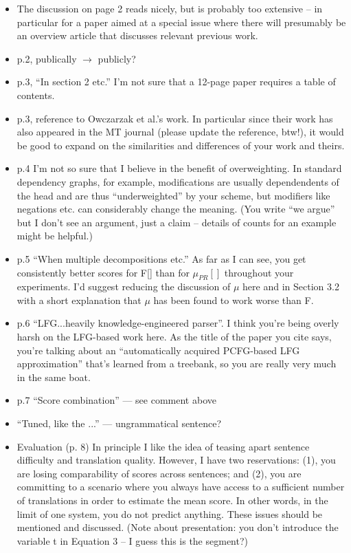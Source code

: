 \documentclass[letterpaper,12pt]{article}
\begin{document}
\begin{itemize}
\item The discussion on page 2 reads nicely, but is probably too
  extensive -- in particular for a paper aimed at a special issue
  where there will presumably be an overview article that discusses
  relevant previous work.

\item  p.2, publically $\to$ publicly?

\item  p.3, ``In section 2 etc.'' I'm not sure that a 12-page paper
  requires a table of contents.

\item  p.3, reference to Owczarzak et al.'s work. In particular since
  their work has also appeared in the MT journal (please update the
  reference, btw!), it would be good to expand on the similarities and
  differences of your work and theirs.

\item p.4 I'm not so sure that I believe in the benefit of overweighting.
  In standard dependency graphs, for example, modifications are
  usually dependendents of the head and are thus ``underweighted'' by
  your scheme, but modifiers like negations etc. can considerably
  change the meaning.  (You write ``we argue'' but I don't see an
  argument, just a claim -- details of counts for an example might be
  helpful.)

\item p.5 ``When multiple decompositions etc.'' As far as I can see, you
  get consistently better scores for F[] than for $\mu_{PR}[]$
  throughout your experiments.  I'd suggest reducing the discussion of
  $\mu$ here and in Section 3.2 with a short explanation that $\mu$
  has been found to work worse than F.

\item  p.6 ``LFG...heavily knowledge-engineered parser''. I think you're
  being overly harsh on the LFG-based work here. As the title of the
  paper you cite says, you're talking about an ``automatically acquired
  PCFG-based LFG approximation'' that's learned from a treebank, so you
  are really very much in the same boat.

\item p.7 ``Score combination'' --- see comment above 

\item ``Tuned, like the ...''  --- ungrammatical sentence?

\item  Evaluation (p. 8) In principle I like the idea of teasing apart
  sentence difficulty and translation quality. However, I have two
  reservations: (1), you are losing comparability of scores across
  sentences; and (2), you are committing to a scenario where you
  always have access to a sufficient number of translations in order
  to estimate the mean score. In other words, in the limit of one
  system, you do not predict anything.  These issues should be
  mentioned and discussed.  (Note about presentation: you don't
  introduce the variable t in Equation 3 -- I guess this is the
  segment?)
 

\end{itemize}
\end{document}
